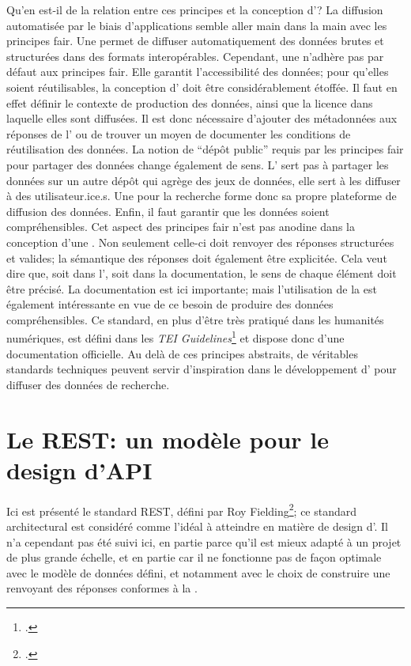 Qu'en est-il de la relation entre ces principes et la conception d'\api{}? La diffusion automatisée par le biais d'applications semble aller main dans la main avec les principes \gls{fair}. Une \api{} permet de diffuser automatiquement des données brutes et structurées dans des formats interopérables. Cependant, une \api{} n'adhère pas par défaut aux principes \gls{fair}. Elle garantit l'accessibilité des données; pour qu'elles soient réutilisables, la conception d'\api{} doit être considérablement étoffée. Il faut en effet définir le contexte de production des données, ainsi que la licence dans laquelle elles sont diffusées. Il est donc nécessaire d'ajouter des métadonnées aux réponses de l'\api{} ou de trouver un moyen de documenter les conditions de réutilisation des données. La notion de \enquote{dépôt public} requis par les principes \gls{fair} pour partager des données change également de sens. L'\api{} sert pas à partager les données sur un autre dépôt qui agrège des jeux de données, elle sert à les diffuser à des utilisateur.ice.s. Une \api{} pour la recherche forme donc sa propre plateforme de diffusion des données. Enfin, il faut garantir que les données soient compréhensibles. Cet aspect des principes \gls{fair} n'est pas anodine dans la conception d'une \api{}. Non seulement celle-ci doit renvoyer des réponses structurées et valides; la sémantique des réponses doit également être explicitée. Cela veut dire que, soit dans l'\api{}, soit dans la documentation, le sens de chaque élément doit être précisé. La documentation est ici importante; mais l'utilisation de la \tei{} est également intéressante en vue de ce besoin de produire des données compréhensibles. Ce standard, en plus d'être très pratiqué dans les humanités numériques, est défini dans les \textit{TEI Guidelines}\footcite{tei_consortium_p5_2022} et dispose donc d'une documentation officielle. Au delà de ces principes abstraits, de véritables standards techniques peuvent servir d'inspiration dans le développement d'\api{} pour diffuser des données de recherche.

\section{Le REST: un modèle pour le design d'API}
Ici est présenté le standard REST, défini par Roy Fielding\footcite{fielding_architectural_2000}; ce standard architectural est considéré comme l'idéal à atteindre en matière de design d'\api{}. Il n'a cependant pas été suivi ici, en partie parce qu'il est mieux adapté à un projet de plus grande échelle, et en partie car il ne fonctionne pas de façon optimale avec le modèle de données défini, et notamment avec le choix de construire une \api{} renvoyant des réponses conformes à la \tei{}.


